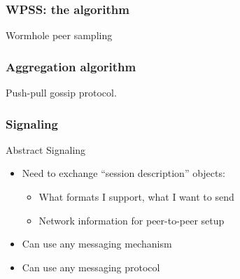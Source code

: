 \documentclass{beamer}
\begin{document}
\begin{frame}
\frametitle{WPSS: the algorithm}
    
\begin{algorithm}[H]

  \caption{Wormhole peer sampling}
\end{algorithm}
\end{frame}


\begin{frame}
\frametitle{Aggregation algorithm}

\begin{algorithm}[H]



  \caption{Push-pull gossip protocol.}
\end{algorithm}
\end{frame}


\begin{frame}\frametitle{Signaling}
    
Abstract Signaling
\begin{itemize}
  \item Need to exchange ``session description'' objects:
  \begin{itemize}
    \item What formats I support, what I want to send
    \item Network information for peer-to-peer setup
  \end{itemize}
  \item Can use any messaging mechanism
  \item Can use any messaging protocol
\end{itemize}
\end{frame}
\end{document}
